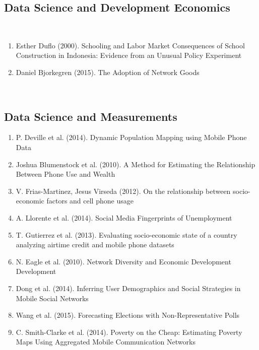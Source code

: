 \subsection{Data Science and Development Economics}  \\  
\begin{enumerate}  
\item  Esther Duflo (2000).  Schooling and Labor Market Consequences of School Construction in Indonesia: Evidence from an Unusual Policy Experiment \cite{Duflo_2000} 
\item Daniel Bjorkegren (2015).  The Adoption of Network Goods \cite{Bjorkegren} 
\end{enumerate}  
\\  
\subsection{Data Science and Measurements}  
\begin{enumerate}  
\item  P. Deville et al. (2014).  Dynamic Population Mapping using Mobile Phone Data\cite{Deville_2014} 
\item  Joshua Blumenstock et al. (2010).  A Method for Estimating the Relationship Between Phone Use and Wealth\cite{blumenstock2010method}  
\item  V. Frias-Martinez, Jesus Virseda (2012).  On the relationship between socio-economic factors and cell phone usage \cite{Frias_Martinez_2012} 
\item A. Llorente et al. (2014).  Social Media Fingerprints of Unemployment\cite{Llorente_2015}  
\item T. Gutierrez et al. (2013).  Evaluating socio-economic state of a country analyzing airtime credit and mobile phone datasets\cite{gutierrez2013evaluating}  
\item N. Eagle et al. (2010).  Network Diversity and Economic Development\cite{eagle2010network} Development  
\item Dong et al. (2014).  Inferring User Demographics and Social Strategies in Mobile Social Networks \cite{Dong:2014:IUD:2623330.2623703} 
\item Wang et al. (2015).  Forecasting Elections with Non-Representative Polls\cite{Wang2015980} 
\item C. Smith-Clarke et al. (2014).  Poverty on the Cheap: Estimating Poverty Maps Using Aggregated Mobile Communication Networks\cite{Smith-Clarke:2014:PCE:2556288.2557358} 
\end{enumerate}  
